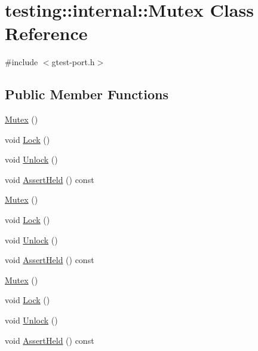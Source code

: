 \hypertarget{classtesting_1_1internal_1_1_mutex}{}\section{testing\+::internal\+::Mutex Class Reference}
\label{classtesting_1_1internal_1_1_mutex}


{\ttfamily \#include $<$gtest-\/port.\+h$>$}

\subsection*{Public Member Functions}
\begin{DoxyCompactItemize}
\item 
\mbox{\hyperlink{classtesting_1_1internal_1_1_mutex_a38e1833a78e3eec81ad23ce1b056b40e}{Mutex}} ()
\item 
void \mbox{\hyperlink{classtesting_1_1internal_1_1_mutex_ae7e2191886c00182176b23c4f4d049f8}{Lock}} ()
\item 
void \mbox{\hyperlink{classtesting_1_1internal_1_1_mutex_a315188055de1be98884519ad84eff2e6}{Unlock}} ()
\item 
void \mbox{\hyperlink{classtesting_1_1internal_1_1_mutex_af45bf1660ac4110338a02a8680b2f486}{Assert\+Held}} () const
\item 
\mbox{\hyperlink{classtesting_1_1internal_1_1_mutex_a38e1833a78e3eec81ad23ce1b056b40e}{Mutex}} ()
\item 
void \mbox{\hyperlink{classtesting_1_1internal_1_1_mutex_ae7e2191886c00182176b23c4f4d049f8}{Lock}} ()
\item 
void \mbox{\hyperlink{classtesting_1_1internal_1_1_mutex_a315188055de1be98884519ad84eff2e6}{Unlock}} ()
\item 
void \mbox{\hyperlink{classtesting_1_1internal_1_1_mutex_af45bf1660ac4110338a02a8680b2f486}{Assert\+Held}} () const
\item 
\mbox{\hyperlink{classtesting_1_1internal_1_1_mutex_a38e1833a78e3eec81ad23ce1b056b40e}{Mutex}} ()
\item 
void \mbox{\hyperlink{classtesting_1_1internal_1_1_mutex_ae7e2191886c00182176b23c4f4d049f8}{Lock}} ()
\item 
void \mbox{\hyperlink{classtesting_1_1internal_1_1_mutex_a315188055de1be98884519ad84eff2e6}{Unlock}} ()
\item 
void \mbox{\hyperlink{classtesting_1_1internal_1_1_mutex_af45bf1660ac4110338a02a8680b2f486}{Assert\+Held}} () const
\end{DoxyCompactItemize}



